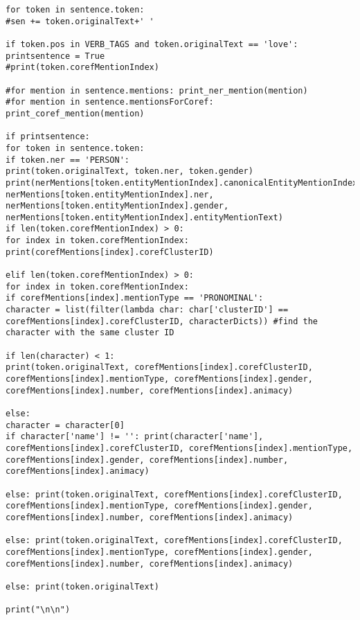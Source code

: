 \documentclass{pre-tfg}
\begin{document}
\begin{lstlisting}[style=consola]
for token in sentence.token:
#sen += token.originalText+' '

if token.pos in VERB_TAGS and token.originalText == 'love':
printsentence = True
#print(token.corefMentionIndex)

#for mention in sentence.mentions: print_ner_mention(mention)
#for mention in sentence.mentionsForCoref: print_coref_mention(mention)

if printsentence:
for token in sentence.token:
if token.ner == 'PERSON':
print(token.originalText, token.ner, token.gender)
print(nerMentions[token.entityMentionIndex].canonicalEntityMentionIndex, nerMentions[token.entityMentionIndex].ner, nerMentions[token.entityMentionIndex].gender, nerMentions[token.entityMentionIndex].entityMentionText)
if len(token.corefMentionIndex) > 0:
for index in token.corefMentionIndex: print(corefMentions[index].corefClusterID)

elif len(token.corefMentionIndex) > 0:
for index in token.corefMentionIndex:
if corefMentions[index].mentionType == 'PRONOMINAL':
character = list(filter(lambda char: char['clusterID'] == corefMentions[index].corefClusterID, characterDicts)) #find the character with the same cluster ID

if len(character) < 1:
print(token.originalText, corefMentions[index].corefClusterID, corefMentions[index].mentionType, corefMentions[index].gender, corefMentions[index].number, corefMentions[index].animacy)

else:
character = character[0]
if character['name'] != '': print(character['name'], corefMentions[index].corefClusterID, corefMentions[index].mentionType, corefMentions[index].gender, corefMentions[index].number, corefMentions[index].animacy)

else: print(token.originalText, corefMentions[index].corefClusterID, corefMentions[index].mentionType, corefMentions[index].gender, corefMentions[index].number, corefMentions[index].animacy)

else: print(token.originalText, corefMentions[index].corefClusterID, corefMentions[index].mentionType, corefMentions[index].gender, corefMentions[index].number, corefMentions[index].animacy)

else: print(token.originalText)

print("\n\n")



\end{lstlisting}

\cleardoublepage
\end{document}

